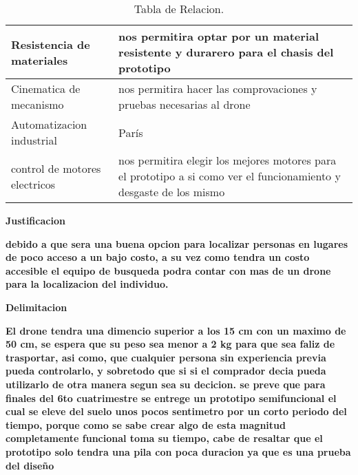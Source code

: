 \documentclass[12pt]{report}
\begin{document}
{\begin{table}[htb]
\begin{tabular}{| p{5.2cm}| p{10.2cm} |}
Resistencia de materiales & nos permitira optar por un material resistente y durarero para el chasis del prototipo  \\ \hline
Cinematica de mecanismo & nos permitira hacer las comprovaciones y pruebas necesarias al drone \\ \hline 
Automatizacion industrial  & París \\ \hline
control de motores electricos   & nos permitira elegir los mejores motores para el prototipo a si como ver el funcionamiento y desgaste de los mismo  \\ \hline
\end{tabular}
\caption{Tabla de Relacion.}
\label{tabla:anchofijo}
\end{table}


{\huge \textbf{Justificacion }\\}


{\large\textbf{ debido a que sera una buena opcion para localizar personas en lugares de poco acceso a un bajo costo, a su vez como tendra un costo accesible el equipo de busqueda podra contar con mas de un drone para la localizacion del individuo.  }\\}



{\huge \textbf{Delimitacion }\\}


{\large \textbf{El drone tendra una dimencio superior a los 15 cm con un maximo de 50 cm, se espera que su peso sea menor a 2 kg para que sea faliz de trasportar, asi como, que cualquier persona sin experiencia previa pueda controlarlo, y sobretodo que si si el comprador decia pueda utilizarlo de otra manera segun sea su decicion. se preve que para finales del 6to cuatrimestre se entrege un prototipo semifuncional el cual se eleve del suelo unos pocos sentimetro por un corto periodo del tiempo, porque como se sabe crear algo de esta magnitud completamente funcional toma su tiempo, cabe de resaltar que el prototipo solo tendra una pila con poca duracion ya que es una prueba del diseño} }\\ \\


}
\end{document}
